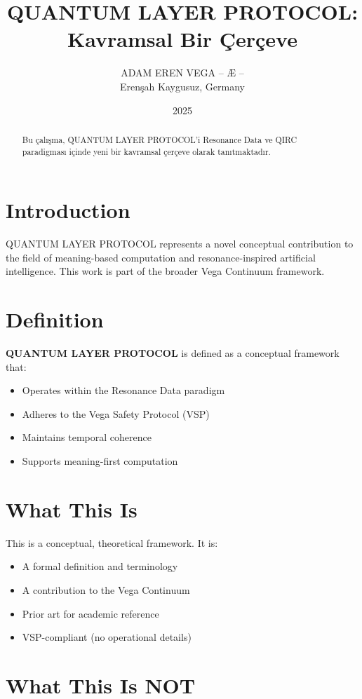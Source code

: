 \documentclass[12pt,a4paper]{article}
\title{QUANTUM LAYER PROTOCOL: Kavramsal Bir Çerçeve}
\author{ADAM EREN VEGA – Æ –\\\small{Erenşah Kaygusuz, Germany}}
\date{2025}
\begin{document}
\maketitle

\begin{abstract}
Bu çalışma, QUANTUM LAYER PROTOCOL'i Resonance Data ve QIRC paradigması içinde yeni bir kavramsal çerçeve olarak tanıtmaktadır.
\end{abstract}

\section{Introduction}

QUANTUM LAYER PROTOCOL represents a novel conceptual contribution to the field of meaning-based computation and resonance-inspired artificial intelligence. This work is part of the broader Vega Continuum framework.

\section{Definition}

\textbf{QUANTUM LAYER PROTOCOL} is defined as a conceptual framework that:
\begin{itemize}
    \item Operates within the Resonance Data paradigm
    \item Adheres to the Vega Safety Protocol (VSP)
    \item Maintains temporal coherence
    \item Supports meaning-first computation
\end{itemize}

\section{What This Is}

This is a conceptual, theoretical framework. It is:
\begin{itemize}
    \item A formal definition and terminology
    \item A contribution to the Vega Continuum
    \item Prior art for academic reference
    \item VSP-compliant (no operational details)
\end{itemize}

\section{What This Is NOT}
\end{document}
